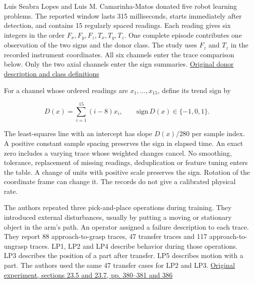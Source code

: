 Luis Seabra Lopes and Luis M. Camarinha-Matos donated five robot learning problems. The reported window lasts 315 milliseconds, starts immediately after detection, and contains 15 regularly spaced readings. Each reading gives six integers in the order \(F_x,F_y,F_z,T_x,T_y,T_z\). One complete episode contributes one observation of the two signs and the donor class. The study uses \(F_z\) and \(T_z\) in the recorded instrument coordinates. All six channels enter the trace comparison below. Only the two axial channels enter the sign summaries. \href{https://archive.ics.uci.edu/ml/machine-learning-databases/robotfailure-mld/robotfailure.data.html}{Original donor description and class definitions}

For a channel whose ordered readings are \(x_1,\ldots,x_{15}\), define its trend sign by

\[
D(x)=\sum_{i=1}^{15}(i-8)x_i,\qquad \mathrm{sign}\,D(x)\in\{-1,0,1\}.
\]

The least-squares line with an intercept has slope \(D(x)/280\) per sample index. A positive constant sample spacing preserves the sign in elapsed time. An exact zero includes a varying trace whose weighted changes cancel. No smoothing, tolerance, replacement of missing readings, deduplication or feature tuning enters the table. A change of units with positive scale preserves the sign. Rotation of the coordinate frame can change it. The records do not give a calibrated physical rate.

The authors repeated three pick-and-place operations during training. They introduced external disturbances, usually by putting a moving or stationary object in the arm's path. An operator assigned a failure description to each trace. They report 88 approach-to-grasp traces, 47 transfer traces and 117 approach-to-ungrasp traces. LP1, LP2 and LP4 describe behavior during those operations. LP3 describes the position of a part after transfer. LP5 describes motion with a part. The authors used the same 47 transfer cases for LP2 and LP3. \href{https://doi.org/10.1007/978-1-4615-5725-8_23}{Original experiment, sections 23.5 and 23.7, pp. 380--381 and 386}

